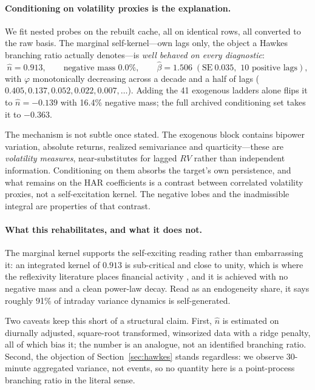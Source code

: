 

\paragraph{Conditioning on volatility proxies is the explanation.}
 We fit nested probes on the rebuilt cache, all on
identical rows, all converted to the raw basis. The marginal self-kernel---own
lags only, the object a Hawkes branching ratio actually denotes---is
\emph{well behaved on every diagnostic}:
\begin{equation}
  \hat n = 0.913, \qquad
  \text{negative mass } 0.0\%, \qquad
  \hat\beta = 1.506 \; (\mathrm{SE}\ 0.035, \text{ 10 positive lags}),
  \label{eq:marginal_kernel}
\end{equation}
with $\varphi$ monotonically decreasing across a decade and a half of lags
($0.405, 0.137, 0.052, 0.022, 0.007, \ldots$). Adding the 41 exogenous ladders
alone flips it to $\hat n = -0.139$ with 16.4\% negative mass; the full archived
conditioning set takes it to $-0.363$.

The mechanism is not subtle once stated. The exogenous block contains bipower
variation, absolute returns, realized semivariance and quarticity---these are
\emph{volatility measures}, near-substitutes for lagged $RV$ rather than
independent information. Conditioning on them absorbs the target's own
persistence, and what remains on the HAR coefficients is a contrast between
correlated volatility proxies, not a self-excitation kernel. The negative lobes
and the inadmissible integral are properties of that contrast.

\paragraph{What this rehabilitates, and what it does not.} The marginal kernel
supports the self-exciting reading rather than embarrassing it: an integrated
kernel of $0.913$ is sub-critical and close to unity, which is where the
reflexivity literature places financial activity
\citep{HardimanBercotBouchaud2013, FilimonovSornette2012}, and it is achieved
with no negative mass and a clean power-law decay. Read as an endogeneity
share, it says roughly 91\% of intraday variance dynamics is self-generated.

Two caveats keep this short of a structural claim. First, $\hat n$ is estimated
on diurnally adjusted, square-root transformed, winsorized data with a ridge
penalty, all of which bias it; the number is an analogue, not an identified
branching ratio. Second, the objection of Section~\ref{sec:hawkes} stands
regardless: we observe 30-minute aggregated variance, not events, so no
quantity here is a point-process branching ratio in the literal sense.

